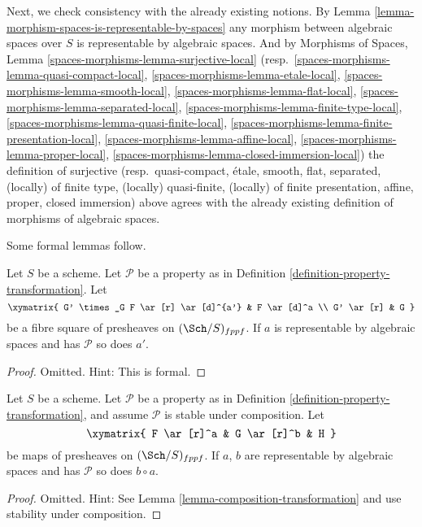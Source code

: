 \medskip\noindent
Next, we check consistency with the already existing notions. By
Lemma \ref{lemma-morphism-spaces-is-representable-by-spaces}
any morphism between algebraic spaces over $S$ is representable by
algebraic spaces. And by
Morphisms of Spaces,
Lemma \ref{spaces-morphisms-lemma-surjective-local}
(resp.\ \ref{spaces-morphisms-lemma-quasi-compact-local},
\ref{spaces-morphisms-lemma-etale-local},
\ref{spaces-morphisms-lemma-smooth-local},
\ref{spaces-morphisms-lemma-flat-local},
\ref{spaces-morphisms-lemma-separated-local},
\ref{spaces-morphisms-lemma-finite-type-local},
\ref{spaces-morphisms-lemma-quasi-finite-local},
\ref{spaces-morphisms-lemma-finite-presentation-local},
\ref{spaces-morphisms-lemma-affine-local},
\ref{spaces-morphisms-lemma-proper-local},
\ref{spaces-morphisms-lemma-closed-immersion-local})
the definition of
surjective
(resp.\ quasi-compact,
\'etale,
smooth,
flat,
separated,
(locally) of finite type,
(locally) quasi-finite,
(locally) of finite presentation,
affine,
proper,
closed immersion)
above agrees with the already existing definition of morphisms
of algebraic spaces.

\medskip\noindent
Some formal lemmas follow.

\begin{lemma}
\label{lemma-base-change-transformation-property}
Let $S$ be a scheme.
Let $\mathcal{P}$ be a property as in
Definition \ref{definition-property-transformation}.
Let
$$
\xymatrix{
G' \times_G F \ar[r] \ar[d]^{a'} & F \ar[d]^a \\
G' \ar[r] & G
}
$$
be a fibre square of presheaves on $(\Sch/S)_{fppf}$.
If $a$ is representable by algebraic spaces and has $\mathcal{P}$
so does $a'$.
\end{lemma}

\begin{proof}
Omitted. Hint: This is formal.
\end{proof}

\begin{lemma}
\label{lemma-composition-transformation-property}
Let $S$ be a scheme.
Let $\mathcal{P}$ be a property as in
Definition \ref{definition-property-transformation},
and assume $\mathcal{P}$ is stable under composition.
Let
$$
\xymatrix{
F \ar[r]^a & G \ar[r]^b & H
}
$$
be maps of presheaves on $(\Sch/S)_{fppf}$.
If $a$, $b$ are representable by algebraic spaces and has
$\mathcal{P}$ so does $b \circ a$.
\end{lemma}

\begin{proof}
Omitted. Hint: See
Lemma \ref{lemma-composition-transformation}
and use stability under composition.
\end{proof}

